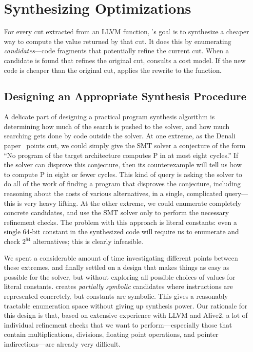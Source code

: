 \section{Synthesizing Optimizations}

For every cut extracted from an LLVM function, \minotaur{}'s goal is to
synthesize a cheaper way to compute the value returned by that cut.
%
It does this by enumerating \emph{candidates}---code fragments that
potentially refine the current cut.
%
When a candidate is found that refines the original cut, \minotaur{}
consults a cost model.
%
If the new code is cheaper than the original cut, \minotaur{} applies the
rewrite to the function.

\subsection{Designing an Appropriate Synthesis Procedure}

A delicate part of designing a practical program synthesis algorithm
is determining how much of the search is pushed to the solver, and how
much searching gets done by code outside the solver.
%
At one extreme, as the Denali paper~\cite{denali02} points out, we
could simply give the SMT solver a conjecture of the form ``No program
of the target architecture computes P in at most eight cycles.''
%
If the solver can disprove this conjecture, then its counterexample
will tell us how to compute P in eight or fewer cycles.
%
This kind of query is asking the solver to do all of the work of
finding a program that disproves the conjecture, including reasoning
about the costs of various alternatives, in a single, complicated
query---this is very heavy lifting.
%
At the other extreme, we could enumerate completely concrete
candidates, and use the SMT solver only to perform the necessary
refinement checks.
%
The problem with this approach is literal constants: even a single
64-bit constant in the synthesized code will require us to enumerate
and check $2^{64}$ alternatives; this is clearly infeasible.


We spent a considerable amount of time investigating different points
between these extremes, and finally settled on a design that makes
things as easy as possible for the solver, but without exploring all
possible choices of values for literal constants.
%
\minotaur{} creates \emph{partially symbolic} candidates where
instructions are represented concretely, but constants are symbolic.
%
This gives a reasonably tractable enumeration space without giving up
synthesis power.
%
Our rationale for this design is that, based on extensive experience
with LLVM and Alive2, a lot of individual refinement checks that we
want to perform---especially those that contain multiplications,
divisions, floating point operations, and pointer indirections---are
already very difficult.


